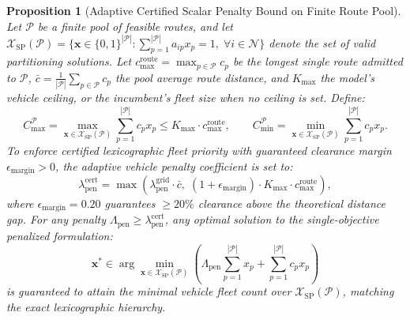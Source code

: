 \documentclass{article}
\newtheorem{proposition}{Proposition}
\begin{document}
\begin{proposition}[Adaptive Certified Scalar Penalty Bound on Finite Route Pool]
Let $\mathcal{P}$ be a finite pool of feasible routes, and let $\mathcal{X}_{\text{SP}}(\mathcal{P}) = \{\mathbf{x} \in \{0, 1\}^{|\mathcal{P}|} : \sum_{p=1}^{|\mathcal{P}|} a_{ip} x_p = 1, \; \forall i \in \mathcal{N}\}$ denote the set of valid partitioning solutions. Let $c_{\max}^{\text{route}} = \max_{p \in \mathcal{P}} c_p$ be the longest single route admitted to $\mathcal{P}$, $\bar{c} = \frac{1}{|\mathcal{P}|}\sum_{p \in \mathcal{P}} c_p$ the pool average route distance, and $K_{\max}$ the model's vehicle ceiling, or the incumbent's fleet size when no ceiling is set. Define:
\begin{equation}
C_{\max}^{\mathcal{P}} = \max_{\mathbf{x} \in \mathcal{X}_{\text{SP}}(\mathcal{P})} \sum_{p=1}^{|\mathcal{P}|} c_p x_p \le K_{\max} \cdot c_{\max}^{\text{route}}, \qquad C_{\min}^{\mathcal{P}} = \min_{\mathbf{x} \in \mathcal{X}_{\text{SP}}(\mathcal{P})} \sum_{p=1}^{|\mathcal{P}|} c_p x_p.
\end{equation}
To enforce certified lexicographic fleet priority with guaranteed clearance margin $\epsilon_{\text{margin}} > 0$, the adaptive vehicle penalty coefficient is set to:
\begin{equation}
\lambda_{\text{pen}}^{\text{cert}} = \max\left( \lambda_{\text{pen}}^{\text{grid}} \cdot \bar{c}, \; (1 + \epsilon_{\text{margin}}) \cdot K_{\max} \cdot c_{\max}^{\text{route}} \right),
\label{eq:adaptive_lambda_supp}
\end{equation}
where $\epsilon_{\text{margin}} = 0.20$ guarantees $\ge 20\%$ clearance above the theoretical distance gap. For any penalty $\Lambda_{\text{pen}} \ge \lambda_{\text{pen}}^{\text{cert}}$, any optimal solution to the single-objective penalized formulation:
\begin{equation}
\mathbf{x}^* \in \arg\min_{\mathbf{x} \in \mathcal{X}_{\text{SP}}(\mathcal{P})} \left( \Lambda_{\text{pen}} \sum_{p=1}^{|\mathcal{P}|} x_p + \sum_{p=1}^{|\mathcal{P}|} c_p x_p \right)
\end{equation}
is guaranteed to attain the minimal vehicle fleet count over $\mathcal{X}_{\text{SP}}(\mathcal{P})$, matching the exact lexicographic hierarchy.
\end{proposition}
\end{document}
